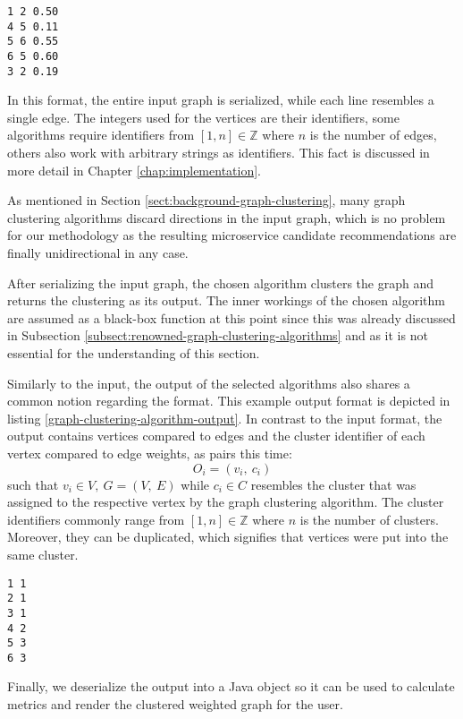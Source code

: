 \documentclass[12pt,a4paper]{report}
\begin{document}
\begin{lstlisting}[caption=Example graph clustering algorithm input, label=graph-clustering-algorithm-input, breaklines=true]
1 2 0.50
4 5 0.11
5 6 0.55
6 5 0.60
3 2 0.19
\end{lstlisting}

In this format, the entire input graph is serialized, while each line resembles
a single edge. The integers used for the vertices are their identifiers, some
algorithms require identifiers from \([1, n] \in \mathbb{Z}\) where \(n\) is
the number of edges, others also work with arbitrary strings as identifiers.
This fact is discussed in more detail in Chapter \ref{chap:implementation}.

As mentioned in Section \ref{sect:background-graph-clustering}, many graph
clustering algorithms discard directions in the input graph, which is no
problem for our methodology as the resulting microservice candidate
recommendations are finally unidirectional in any case.

After serializing the input graph, the chosen algorithm clusters the graph and
returns the clustering as its output. The inner workings of the chosen
algorithm are assumed as a black-box function at this point since this was
already discussed in Subsection \ref{subsect:renowned-graph-clustering-algorithms}
and as it is not essential for the understanding of this section.

Similarly to the input, the output of the selected algorithms also shares a
common notion regarding the format. This example output format is depicted in
listing \ref{graph-clustering-algorithm-output}. In contrast to the input
format, the output contains vertices compared to edges and the cluster
identifier of each vertex compared to edge weights, as pairs this time:
\[
  O_i = (v_i, \ c_i)
\]
such that \(v_i \in V, \ G = (V, \ E)\) while \(c_i \in C\)
resembles the cluster that was assigned to the respective vertex by the graph
clustering algorithm. The cluster identifiers commonly range from \([1, n] \in
\mathbb{Z}\) where \(n\) is the number of clusters. Moreover, they can be
duplicated, which signifies that vertices were put into the same cluster.

\begin{lstlisting}[caption=Example graph clustering algorithm output, label=graph-clustering-algorithm-output, breaklines=true]
1 1
2 1
3 1
4 2
5 3
6 3
\end{lstlisting}

Finally, we deserialize the output into a Java object so it can be used to
calculate metrics and render the clustered weighted graph for the user.
\end{document}
